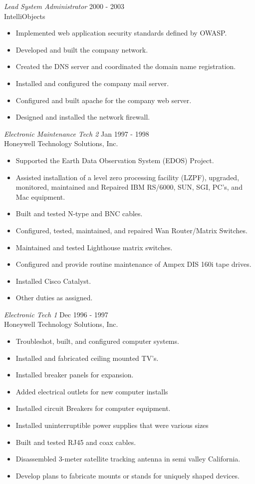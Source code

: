 \documentclass[margin, 10pt]{res} %
\begin{document}
\begin{resume}
{\sl Lead System Administrator } \hfill 2000 - 2003 \\
IntelliObjects
\begin{itemize}
\item Implemented web application security standards defined by OWASP.
\item Developed and built the company network.
\item Created the DNS server and coordinated the domain name registration.
\item Installed and configured the company mail server.
\item Configured and built apache for the company web server.
\item Designed and installed the network firewall.
\end{itemize}

{\sl Electronic Maintenance Tech 2 } \hfill Jan 1997 - 1998 \\
Honeywell Technology Solutions, Inc.
\begin{itemize} \itemsep -2pt %
\item Supported the Earth Data Observation System (EDOS) Project.
\item Assisted installation of a level zero processing facility (LZPF), upgraded, monitored, maintained and Repaired IBM RS/6000, SUN, SGI, PC's, and Mac equipment.
\item Built and tested N-type and BNC cables.
\item Configured, tested, maintained, and repaired Wan Router/Matrix Switches.
\item Maintained and tested Lighthouse matrix switches.
\item Configured and provide routine maintenance of Ampex DIS 160i tape drives.
\item Installed Cisco Catalyst.
\item Other duties as assigned.
\end{itemize}

{\sl Electronic Tech 1} \hfill Dec 1996 - 1997\\
Honeywell Technology Solutions, Inc.
\begin{itemize}
\item Troubleshot, built, and configured computer systems.
\item Installed and fabricated ceiling mounted TV's.
\item Installed breaker panels for expansion.
\item Added electrical outlets for new computer installs
\item Installed circuit Breakers for computer equipment.
\item Installed uninterruptible power supplies that were various sizes
\item Built and tested RJ45 and coax cables.
\item Disassembled 3-meter satellite tracking antenna in semi valley California.
\item Develop plans to fabricate mounts or stands for uniquely shaped devices.
\end{itemize}


\end{resume}
\end{document}
